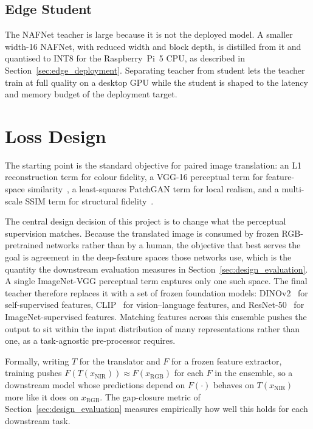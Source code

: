 \subsection{Edge Student}
\label{sec:edge_student}

The NAFNet teacher is large because it is not the deployed model. A smaller width-16 NAFNet, with reduced width and block depth, is distilled from it and quantised to INT8 for the Raspberry~Pi~5 CPU, as described in Section~\ref{sec:edge_deployment}. Separating teacher from student lets the teacher train at full quality on a desktop GPU while the student is shaped to the latency and memory budget of the deployment target.

\section{Loss Design}
\label{sec:loss_design}

The starting point is the standard objective for paired image translation: an L1 reconstruction term for colour fidelity, a VGG-16 perceptual term for feature-space similarity~\cite{johnson2016perceptual}, a least-squares PatchGAN term for local realism, and a multi-scale SSIM term for structural fidelity~\cite{wang2003msssim}.

The central design decision of this project is to change what the perceptual supervision matches. Because the translated image is consumed by frozen RGB-pretrained networks rather than by a human, the objective that best serves the goal is agreement in the deep-feature spaces those networks use, which is the quantity the downstream evaluation measures in Section~\ref{sec:design_evaluation}. A single ImageNet-VGG perceptual term captures only one such space. The final teacher therefore replaces it with a set of frozen foundation models: DINOv2~\cite{oquab2024dinov2} for self-supervised features, CLIP~\cite{radford2021clip} for vision--language features, and ResNet-50~\cite{he2016resnet} for ImageNet-supervised features. Matching features across this ensemble pushes the output to sit within the input distribution of many representations rather than one, as a task-agnostic pre-processor requires.

Formally, writing $T$ for the translator and $F$ for a frozen feature extractor, training pushes $F(T(x_{\text{NIR}})) \approx F(x_{\text{RGB}})$ for each $F$ in the ensemble, so a downstream model whose predictions depend on $F(\cdot)$ behaves on $T(x_{\text{NIR}})$ more like it does on $x_{\text{RGB}}$. The gap-closure metric of Section~\ref{sec:design_evaluation} measures empirically how well this holds for each downstream task.

